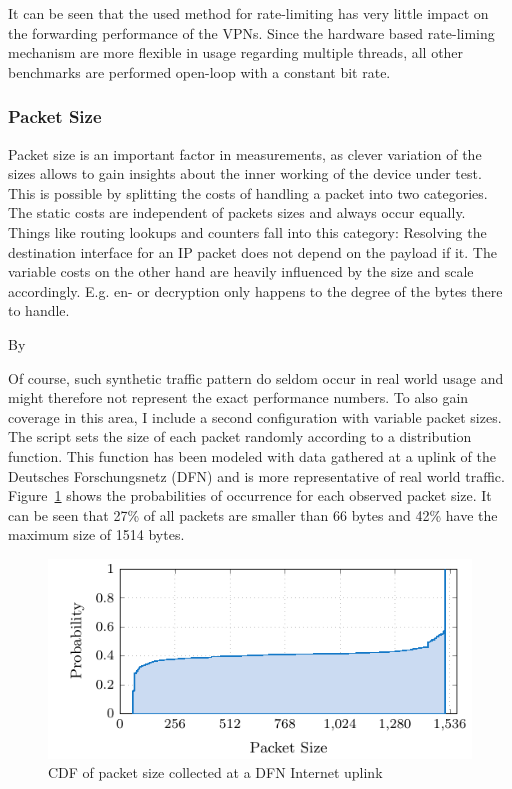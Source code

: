 \documentclass[IN,11pt,twoside,openright,master,english]{tumthesis}
\begin{document}
It can be seen that the used method for rate-limiting has very little impact on the forwarding performance of the VPNs. Since the hardware based rate-liming mechanism are more flexible in usage regarding multiple threads, all other benchmarks are performed open-loop with a constant bit rate.

\subsubsection{Packet Size}
Packet size is an important factor in measurements, as clever variation of the sizes allows to gain insights about the inner working of the device under test. This is possible by splitting the costs of handling a packet into two categories. 
The static costs are independent of packets sizes and always occur equally. Things like routing lookups and counters fall into this category: Resolving the destination interface for an IP packet does not depend on the payload if it.
The variable costs on the other hand are heavily influenced by the size and scale accordingly. E.g. en- or decryption only happens to the degree of the bytes there to handle.

By 

Of course, such synthetic traffic pattern do seldom occur in real world usage and might therefore not represent the exact performance numbers. To also gain coverage in this area, I include a second configuration with variable packet sizes. The script sets the size of each packet randomly according to a distribution function. This function has been modeled with data gathered at a uplink of the Deutsches Forschungsnetz (DFN) and is more representative of real world traffic. Figure~\ref{fig:dfn-cdf} shows the probabilities of occurrence for each observed packet size. It can be seen that 27\% of all packets are smaller than 66 bytes and 42\% have the maximum size of 1514 bytes.

\begin{figure}[h]
	\centering
	\includegraphics[width=0.9\linewidth]{figures/dfn-cdf}
	\caption{CDF of packet size collected at a DFN Internet uplink}
	\label{fig:dfn-cdf}
\end{figure}
\end{document}
